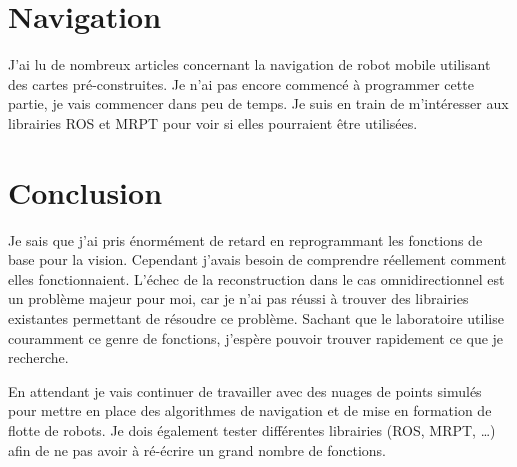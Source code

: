 \documentclass[10pt]{article}
\begin{document}
\section{Navigation}

J'ai lu de nombreux articles concernant la navigation de robot mobile utilisant des cartes pré-construites.
Je n'ai pas encore commencé à programmer cette partie, je vais commencer dans peu de temps.
Je suis en train de m'intéresser aux librairies ROS et MRPT pour voir si elles pourraient être utilisées.

\section{Conclusion}

Je sais que j'ai pris énormément de retard en reprogrammant les fonctions de base pour la vision.
Cependant j'avais besoin de comprendre réellement comment elles fonctionnaient.
L'échec de la reconstruction dans le cas omnidirectionnel est un problème majeur pour moi, car je n'ai pas réussi à trouver des librairies existantes permettant de résoudre ce problème.
Sachant que le laboratoire utilise couramment ce genre de fonctions, j'espère pouvoir trouver rapidement ce que je recherche.

En attendant je vais continuer de travailler avec des nuages de points simulés pour mettre en place des algorithmes de navigation et de mise en formation de flotte de robots.
Je dois également tester différentes librairies (ROS, MRPT, \dots) afin de ne pas avoir à ré-écrire un grand nombre de fonctions.
\end{document}

